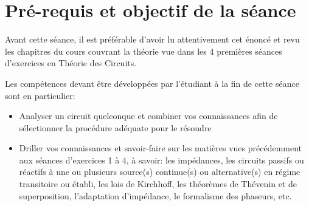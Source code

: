 \pagestyle{fancy}
\cfoot{}





\setlength{\parskip}{0.5cm plus4mm minus3mm} %
\setlength{\parindent}{0pt}





\section{Pré-requis et objectif de la séance}
Avant cette séance, il est préférable d'avoir lu attentivement cet énoncé et revu les chapitres du cours couvrant la théorie vue dans les 4 premières séances d'exercices en Théorie des Circuits.

Les compétences devant être développées par l'étudiant à la fin de cette séance sont en particulier:
\begin{itemize}
	\item Analyser un circuit quelconque et combiner vos connaissances afin de sélectionner la procédure adéquate pour le résoudre
	\item Driller vos connaissances et savoir-faire sur les matières vues précédemment aux séances d'exercices 1 à 4, à savoir: les impédances, les circuits passifs ou réactifs à une ou plusieurs source(s) continue(s) ou alternative(s) en régime transitoire ou établi, les lois de Kirchhoff, les théorèmes de Thévenin et de superposition, l'adaptation d'impédance, le formalisme des phaseurs, etc.  
\end{itemize}

